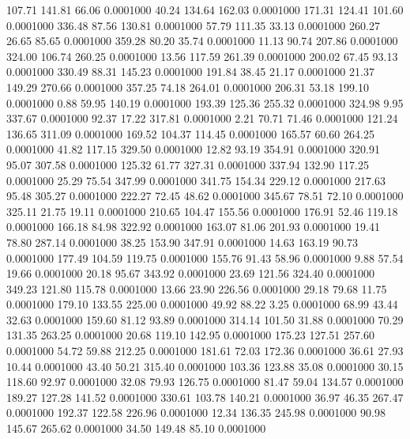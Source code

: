  107.71  141.81   66.06   0.0001000
  40.24  134.64  162.03   0.0001000
 171.31  124.41  101.60   0.0001000
 336.48   87.56  130.81   0.0001000
  57.79  111.35   33.13   0.0001000
 260.27   26.65   85.65   0.0001000
 359.28   80.20   35.74   0.0001000
  11.13   90.74  207.86   0.0001000
 324.00  106.74  260.25   0.0001000
  13.56  117.59  261.39   0.0001000
 200.02   67.45   93.13   0.0001000
 330.49   88.31  145.23   0.0001000
 191.84   38.45   21.17   0.0001000
  21.37  149.29  270.66   0.0001000
 357.25   74.18  264.01   0.0001000
 206.31   53.18  199.10   0.0001000
   0.88   59.95  140.19   0.0001000
 193.39  125.36  255.32   0.0001000
 324.98    9.95  337.67   0.0001000
  92.37   17.22  317.81   0.0001000
   2.21   70.71   71.46   0.0001000
 121.24  136.65  311.09   0.0001000
 169.52  104.37  114.45   0.0001000
 165.57   60.60  264.25   0.0001000
  41.82  117.15  329.50   0.0001000
  12.82   93.19  354.91   0.0001000
 320.91   95.07  307.58   0.0001000
 125.32   61.77  327.31   0.0001000
 337.94  132.90  117.25   0.0001000
  25.29   75.54  347.99   0.0001000
 341.75  154.34  229.12   0.0001000
 217.63   95.48  305.27   0.0001000
 222.27   72.45   48.62   0.0001000
 345.67   78.51   72.10   0.0001000
 325.11   21.75   19.11   0.0001000
 210.65  104.47  155.56   0.0001000
 176.91   52.46  119.18   0.0001000
 166.18   84.98  322.92   0.0001000
 163.07   81.06  201.93   0.0001000
  19.41   78.80  287.14   0.0001000
  38.25  153.90  347.91   0.0001000
  14.63  163.19   90.73   0.0001000
 177.49  104.59  119.75   0.0001000
 155.76   91.43   58.96   0.0001000
   9.88   57.54   19.66   0.0001000
  20.18   95.67  343.92   0.0001000
  23.69  121.56  324.40   0.0001000
 349.23  121.80  115.78   0.0001000
  13.66   23.90  226.56   0.0001000
  29.18   79.68   11.75   0.0001000
 179.10  133.55  225.00   0.0001000
  49.92   88.22    3.25   0.0001000
  68.99   43.44   32.63   0.0001000
 159.60   81.12   93.89   0.0001000
 314.14  101.50   31.88   0.0001000
  70.29  131.35  263.25   0.0001000
  20.68  119.10  142.95   0.0001000
 175.23  127.51  257.60   0.0001000
  54.72   59.88  212.25   0.0001000
 181.61   72.03  172.36   0.0001000
  36.61   27.93   10.44   0.0001000
  43.40   50.21  315.40   0.0001000
 103.36  123.88   35.08   0.0001000
  30.15  118.60   92.97   0.0001000
  32.08   79.93  126.75   0.0001000
  81.47   59.04  134.57   0.0001000
 189.27  127.28  141.52   0.0001000
 330.61  103.78  140.21   0.0001000
  36.97   46.35  267.47   0.0001000
 192.37  122.58  226.96   0.0001000
  12.34  136.35  245.98   0.0001000
  90.98  145.67  265.62   0.0001000
  34.50  149.48   85.10   0.0001000
